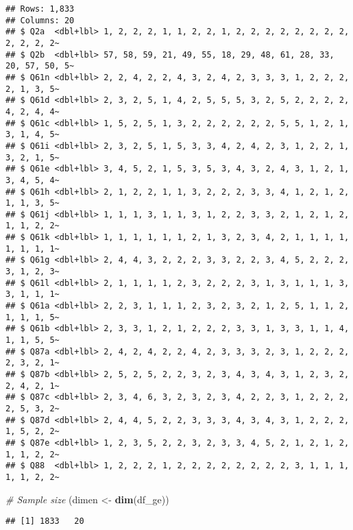 \documentclass[
]{article}
\newenvironment{Shaded}{\begin{snugshade}}{\end{snugshade}}
\newcommand{\CommentTok}[1]{\textcolor[rgb]{0.56,0.35,0.01}{\textit{#1}}}
\newcommand{\KeywordTok}[1]{\textcolor[rgb]{0.13,0.29,0.53}{\textbf{#1}}}
\newcommand{\NormalTok}[1]{#1}
\newcommand{\StringTok}[1]{\textcolor[rgb]{0.31,0.60,0.02}{#1}}
\begin{document}
\begin{verbatim}
## Rows: 1,833
## Columns: 20
## $ Q2a  <dbl+lbl> 1, 2, 2, 2, 1, 1, 2, 2, 1, 2, 2, 2, 2, 2, 2, 2, 2, 2, 2, 2, 2~
## $ Q2b  <dbl+lbl> 57, 58, 59, 21, 49, 55, 18, 29, 48, 61, 28, 33, 20, 57, 50, 5~
## $ Q61n <dbl+lbl> 2, 2, 4, 2, 2, 4, 3, 2, 4, 2, 3, 3, 3, 1, 2, 2, 2, 2, 1, 3, 5~
## $ Q61d <dbl+lbl> 2, 3, 2, 5, 1, 4, 2, 5, 5, 5, 3, 2, 5, 2, 2, 2, 2, 4, 2, 4, 4~
## $ Q61c <dbl+lbl> 1, 5, 2, 5, 1, 3, 2, 2, 2, 2, 2, 2, 5, 5, 1, 2, 1, 3, 1, 4, 5~
## $ Q61i <dbl+lbl> 2, 3, 2, 5, 1, 5, 3, 3, 4, 2, 4, 2, 3, 1, 2, 2, 1, 3, 2, 1, 5~
## $ Q61e <dbl+lbl> 3, 4, 5, 2, 1, 5, 3, 5, 3, 4, 3, 2, 4, 3, 1, 2, 1, 3, 4, 5, 4~
## $ Q61h <dbl+lbl> 2, 1, 2, 2, 1, 1, 3, 2, 2, 2, 3, 3, 4, 1, 2, 1, 2, 1, 1, 3, 5~
## $ Q61j <dbl+lbl> 1, 1, 1, 3, 1, 1, 3, 1, 2, 2, 3, 3, 2, 1, 2, 1, 2, 1, 1, 2, 2~
## $ Q61k <dbl+lbl> 1, 1, 1, 1, 1, 1, 2, 1, 3, 2, 3, 4, 2, 1, 1, 1, 1, 1, 1, 1, 1~
## $ Q61g <dbl+lbl> 2, 4, 4, 3, 2, 2, 2, 3, 3, 2, 2, 3, 4, 5, 2, 2, 2, 3, 1, 2, 3~
## $ Q61l <dbl+lbl> 2, 1, 1, 1, 1, 2, 3, 2, 2, 2, 3, 1, 3, 1, 1, 1, 3, 3, 1, 1, 1~
## $ Q61a <dbl+lbl> 2, 2, 3, 1, 1, 1, 2, 3, 2, 3, 2, 1, 2, 5, 1, 1, 2, 1, 1, 1, 5~
## $ Q61b <dbl+lbl> 2, 3, 3, 1, 2, 1, 2, 2, 2, 3, 3, 1, 3, 3, 1, 1, 4, 1, 1, 5, 5~
## $ Q87a <dbl+lbl> 2, 4, 2, 4, 2, 2, 4, 2, 3, 3, 3, 2, 3, 1, 2, 2, 2, 2, 3, 2, 1~
## $ Q87b <dbl+lbl> 2, 5, 2, 5, 2, 2, 3, 2, 3, 4, 3, 4, 3, 1, 2, 3, 2, 2, 4, 2, 1~
## $ Q87c <dbl+lbl> 2, 3, 4, 6, 3, 2, 3, 2, 3, 4, 2, 2, 3, 1, 2, 2, 2, 2, 5, 3, 2~
## $ Q87d <dbl+lbl> 2, 4, 4, 5, 2, 2, 3, 3, 3, 4, 3, 4, 3, 1, 2, 2, 2, 1, 5, 2, 2~
## $ Q87e <dbl+lbl> 1, 2, 3, 5, 2, 2, 3, 2, 3, 3, 4, 5, 2, 1, 2, 1, 2, 1, 1, 2, 2~
## $ Q88  <dbl+lbl> 1, 2, 2, 2, 1, 2, 2, 2, 2, 2, 2, 2, 2, 3, 1, 1, 1, 1, 1, 2, 2~
\end{verbatim}

\begin{Shaded}
\begin{Highlighting}[]
\CommentTok{# Sample size}
\NormalTok{(dimen <-}\StringTok{ }\KeywordTok{dim}\NormalTok{(df_ge))}
\end{Highlighting}
\end{Shaded}

\begin{verbatim}
## [1] 1833   20
\end{verbatim}
\end{document}
